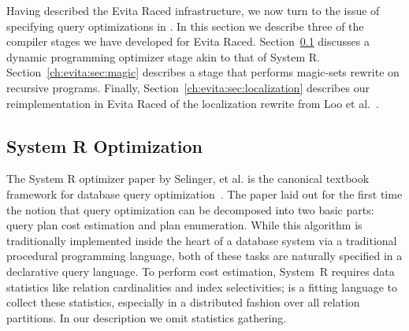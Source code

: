 
Having described the Evita Raced infrastructure, we now turn to the issue of specifying query optimizations 
in \OVERLOG.  In this section we describe three of the compiler stages we have developed for Evita Raced. 
Section~\ref{ch:evita:sec:systemr} discusses a dynamic programming optimizer stage akin to that of
System R. Section~\ref{ch:evita:sec:magic} describes a stage that performs magic-sets rewrite on recursive 
\OVERLOG programs. Finally, Section~\ref{ch:evita:sec:localization} describes our reimplementation in Evita Raced 
of the localization rewrite from Loo et al.~\cite{loo-sigmod06}. 

\subsection{System R Optimization}
\label{ch:evita:sec:systemr}

The System R optimizer paper by Selinger, et al. is the canonical textbook framework for database query optimization~\cite{selinger}.  The paper laid out for
the first time the notion that query optimization can be decomposed
into two basic parts: query plan cost
estimation and plan enumeration.  While this algorithm is traditionally implemented inside
the heart of a database system via a traditional procedural
programming language, both of these tasks are
naturally specified in a declarative query language.  To perform cost
estimation, System~R requires data statistics like relation
cardinalities and index selectivities; \OVERLOG is a fitting language to
collect these statistics, especially in a distributed fashion over all
relation partitions. In our description we omit statistics gathering.

